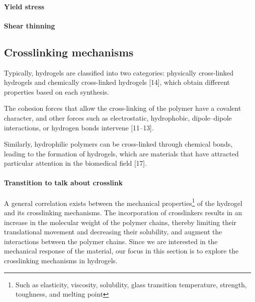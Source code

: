 \paragraph{Yield stress}

\paragraph{Shear thinning}

\subsection{Crosslinking mechanisms}\label{ch1:Cross-linking}


Typically, hydrogels are classified into two categories: physically cross-linked hydrogels and chemically cross-linked hydrogels [14], which obtain different properties based on each synthesis\citep{bustamante-torresHydrogelsClassificationAccording2021}.

The cohesion forces that allow the cross-linking of the polymer have a covalent character, and other forces such as electrostatic, hydrophobic, dipole–dipole interactions, or hydrogen bonds intervene [11–13]\citep{bustamante-torresHydrogelsClassificationAccording2021}. 


Similarly, hydrophilic polymers can be cross-linked through chemical bonds, leading to the formation of hydrogels, which are materials that have attracted particular attention in the biomedical field [17]\citep{bustamante-torresHydrogelsClassificationAccording2021}. 




\paragraph{Transtition to talk about crosslink}
A general correlation exists between the mechanical properties\footnote{Such as elasticity, viscosity, solubility, glass transition temperature, strength, toughness, and melting point\citep{priyaComprehensiveReviewHydrogel2024}} of the hydrogel and its crosslinking mechanisms.
The incorporation of crosslinkers results in an increase in the molecular weight of the polymer chains, thereby limiting their translational movement and decreasing their solubility, and augment the interactions between the polymer chains\citep{priyaComprehensiveReviewHydrogel2024}.
Since we are interested in the mechanical response of the material, our focus in this section is to explore the crosslinking mechanisms in hydrogels.

